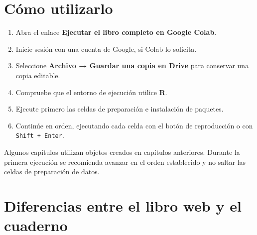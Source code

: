 \documentclass[
  spanish,
  10.5pt,
  letterpaper,
  openany,
  headings=big]{scrbook}
\providecommand{\tightlist}{%
  \setlength{\itemsep}{0pt}\setlength{\parskip}{0pt}}
\begin{document}
\section*{Cómo utilizarlo}\label{cuxf3mo-utilizarlo}


\begin{enumerate}
\def\labelenumi{\arabic{enumi}.}
\tightlist
\item
  Abra el enlace \textbf{Ejecutar el libro completo en Google Colab}.
\item
  Inicie sesión con una cuenta de Google, si Colab lo solicita.
\item
  Seleccione \textbf{Archivo → Guardar una copia en Drive} para
  conservar una copia editable.
\item
  Compruebe que el entorno de ejecución utilice \textbf{R}.
\item
  Ejecute primero las celdas de preparación e instalación de paquetes.
\item
  Continúe en orden, ejecutando cada celda con el botón de reproducción
  o con \texttt{Shift\ +\ Enter}.
\end{enumerate}

\begin{tcolorbox}[enhanced jigsaw, arc=.35mm, bottomrule=.15mm, bottomtitle=1mm, breakable, colback=white, colbacktitle=quarto-callout-warning-color!10!white, colframe=quarto-callout-warning-color-frame, coltitle=black, left=2mm, leftrule=.75mm, opacityback=0, opacitybacktitle=0.6, rightrule=.15mm, title=\textcolor{quarto-callout-warning-color}{\faExclamationTriangle}\hspace{0.5em}{Ejecución en orden}, titlerule=0mm, toprule=.15mm, toptitle=1mm]

Algunos capítulos utilizan objetos creados en capítulos anteriores.
Durante la primera ejecución se recomienda avanzar en el orden
establecido y no saltar las celdas de preparación de datos.

\end{tcolorbox}

\section*{Diferencias entre el libro web y el
cuaderno}\label{diferencias-entre-el-libro-web-y-el-cuaderno}

\end{document}
